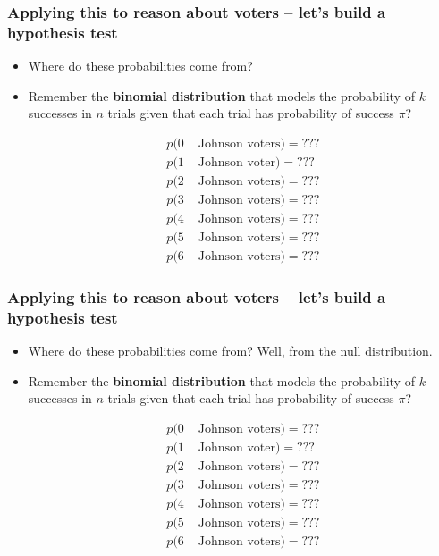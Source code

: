 \documentclass[aspectratio=169]{beamer}
\theoremstyle{principle}
\begin{document}
\begin{frame}
\frametitle{Applying this to reason about voters -- let's build a hypothesis test}

\begin{itemize}

\item Where do these probabilities come from?
\bigskip

\item[]\color{white} Remember the \textbf{binomial distribution} that models the probability of $k$ successes in $n$ trials given that each trial has probability of success $\pi$?\color{black}

\begin{align*}
p(0& \mbox{ Johnson voters}) = ???\\
p(1& \mbox{ Johnson voter}) = ???\\
p(2& \mbox{ Johnson voters}) = ???\\
p(3& \mbox{ Johnson voters}) = ???\\
p(4& \mbox{ Johnson voters}) = ???\\
p(5& \mbox{ Johnson voters}) = ???\\
p(6& \mbox{ Johnson voters}) = ???
\end{align*}

\end{itemize}

\end{frame}

\begin{frame}
\frametitle{Applying this to reason about voters -- let's build a hypothesis test}

\begin{itemize}

\item Where do these probabilities come from?  Well, from the null distribution.
\bigskip

\item[]\color{white} Remember the \textbf{binomial distribution} that models the probability of $k$ successes in $n$ trials given that each trial has probability of success $\pi$?\color{black}

\begin{align*}
p(0& \mbox{ Johnson voters}) = ???\\
p(1& \mbox{ Johnson voter}) = ???\\
p(2& \mbox{ Johnson voters}) = ???\\
p(3& \mbox{ Johnson voters}) = ???\\
p(4& \mbox{ Johnson voters}) = ???\\
p(5& \mbox{ Johnson voters}) = ???\\
p(6& \mbox{ Johnson voters}) = ???
\end{align*}

\end{itemize}

\end{frame}
\end{document}

